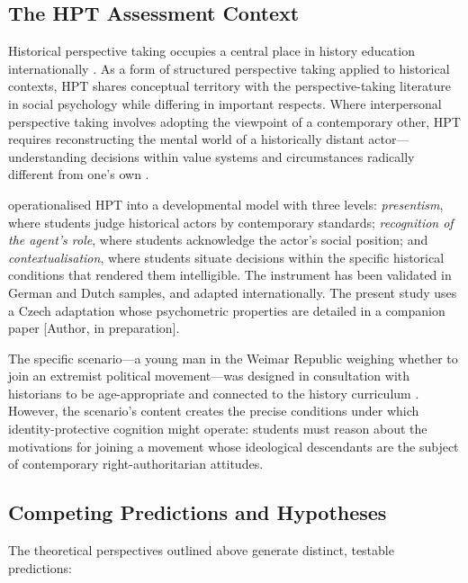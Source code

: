\documentclass[referee,pdflatex,sn-apa]{sn-jnl}
\begin{document}
\subsection{The HPT Assessment Context}\label{subsec:hptcontext}

Historical perspective taking occupies a central place in history education internationally \citep{Seixas2013,vanDrie2007,Wineburg2001}. As a form of structured perspective taking applied to historical contexts, HPT shares conceptual territory with the perspective-taking literature in social psychology \citep{Galinsky2005,Selman1980} while differing in important respects. Where interpersonal perspective taking involves adopting the viewpoint of a contemporary other, HPT requires reconstructing the mental world of a historically distant actor---understanding decisions within value systems and circumstances radically different from one's own \citep{Lee2001}.

\citet{Hartmann2008} operationalised HPT into a developmental model with three levels: \textit{presentism}, where students judge historical actors by contemporary standards; \textit{recognition of the agent's role}, where students acknowledge the actor's social position; and \textit{contextualisation}, where students situate decisions within the specific historical conditions that rendered them intelligible. The instrument has been validated in German \citep{Hartmann2008} and Dutch \citep{Huijgen2014} samples, and adapted internationally. The present study uses a Czech adaptation whose psychometric properties are detailed in a companion paper [Author, in preparation].

The specific scenario---a young man in the Weimar Republic weighing whether to join an extremist political movement---was designed in consultation with historians to be age-appropriate and connected to the history curriculum \citep{Hartmann2008}. However, the scenario's content creates the precise conditions under which identity-protective cognition might operate: students must reason about the motivations for joining a movement whose ideological descendants are the subject of contemporary right-authoritarian attitudes.

\subsection{Competing Predictions and Hypotheses}\label{subsec:hypotheses}

The theoretical perspectives outlined above generate distinct, testable predictions:
\end{document}
